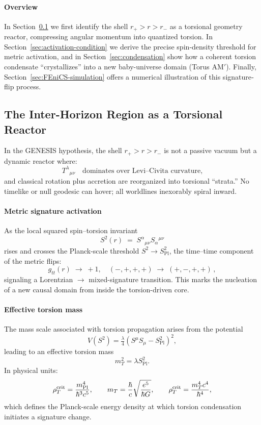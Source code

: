 \documentclass{article}
\newcommand{\Splanck}{S_{\mathrm{Pl}}}
\newcommand{\TorsionProfile}{S^2(r)}
\begin{document}
\paragraph{Overview}  
In Section~\ref{sec:inter-horizon} we first identify the shell $r_+>r>r_-$ as a torsional geometry reactor, compressing angular momentum into quantized torsion.  In Section~\ref{sec:activation-condition} we derive the precise spin‐density threshold for metric activation, and in Section~\ref{sec:condensation} show how a coherent torsion condensate “crystallizes” into a new baby-universe domain (Torus AM$'$). Finally, Section~\ref{sec:FEniCS-simulation} offers a numerical illustration of this signature‐flip process.



\subsection{The Inter-Horizon Region as a Torsional Reactor}
\label{sec:inter-horizon}

In the GENESIS hypothesis, the shell $r_+ > r > r_-$ is not a passive vacuum but a dynamic reactor where:
\[
  T^{\lambda}{}_{\mu\nu}\quad\text{dominates over Levi–Civita curvature,}
\]
and classical rotation plus accretion are reorganized into torsional “strata.”  
No timelike or null geodesic can hover; all worldlines inexorably spiral inward.

\paragraph{Metric signature activation}
As the local squared spin–torsion invariant
\[
  \TorsionProfile \;=\; S^\alpha{}_{\mu\nu}S_\alpha{}^{\mu\nu}
\]
rises and crosses the Planck-scale threshold $S^2 \rightarrow \Splanck^2$, the time–time component of the metric flips:
\[
  g_{tt}(r)\;\longrightarrow\;+1,
  \quad
  (-,+,+,+)\;\longrightarrow\;(+,-,+,+)\,,
\tag{10}
\]
signaling a Lorentzian $\to$ mixed-signature transition. This marks the nucleation of a new causal domain from inside the torsion-driven core.

\paragraph{Effective torsion mass}
The mass scale associated with torsion propagation arises from the potential
\[
  V(S^2) = \tfrac{\lambda}{4}(S^\mu S_\mu - \Splanck^2)^2,
\]
leading to an effective torsion mass
\[
  m_T^2 = \lambda \Splanck^2.
\]
In physical units:
\[
  \rho_T^{\rm crit} = \frac{m_{\rm Pl}^4}{\hbar^3 c^5}, 
  \qquad 
  m_T = \frac{\hbar}{c} \sqrt{\frac{e^5}{\hbar G}}, 
  \qquad 
  \rho_T^{\rm crit} = \frac{m_T^4 c^4}{\hbar^4},
\]
which defines the Planck-scale energy density at which torsion condensation initiates a signature change.
\end{document}
